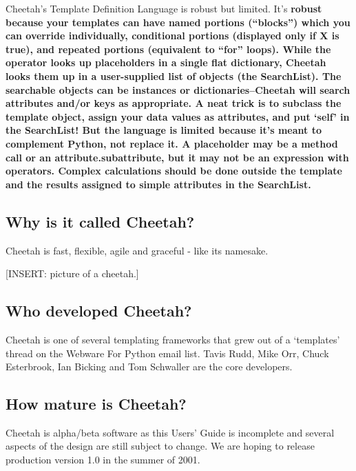 Cheetah's Template Definition Language is robust but limited.  It's
\bf{robust} because your templates can have named portions (``blocks'') which
you can override individually, conditional portions (displayed only if X is
true), and repeated portions (equivalent to ``for'' loops).  While the
\code{\%} operator looks up placeholders in a single flat dictionary, Cheetah
looks them up in a user-supplied list of objects (the SearchList).  The
searchable objects can be instances or dictionaries--Cheetah will search
attributes and/or keys as appropriate.  A neat trick is to subclass the
template object, assign your data values as attributes, and put `self' in the
SearchList!  But the language is \bf{limited} because it's meant to complement
Python, not replace it.  A placeholder may be a method call or an
attribute.subattribute, but it may not be an expression with operators.
Complex calculations should be done outside the template and the results
assigned to simple attributes in the SearchList.



\subsection{Why is it called Cheetah?}
\label{intro.name}

Cheetah is fast, flexible, agile and graceful - like its namesake. 

[INSERT: picture of a cheetah.]


\subsection{Who developed Cheetah?}
\label{intro.developers}

Cheetah is one of several templating frameworks that grew out of a `templates'
thread on the Webware For Python email list.  Tavis Rudd, Mike Orr, Chuck
Esterbrook, Ian Bicking and Tom Schwaller are the core developers.

\subsection{How mature is Cheetah?}
\label{intro.mature}

Cheetah is alpha/beta software as this Users' Guide is incomplete and several
aspects of the design are still subject to change. We are hoping to release
production version 1.0 in the summer of 2001.

